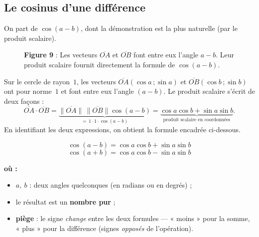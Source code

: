 \documentclass[11pt,a4paper]{article}
\newenvironment{ou}{%
  \par\smallskip\noindent\textbf{où :}\nopagebreak
  \begin{itemize}[leftmargin=1.8em,topsep=2pt,itemsep=1.5pt,parsep=0pt]}%
  {\end{itemize}}
\begin{document}
\subsection{Le cosinus d'une différence}
On part de $\cos(a-b)$, dont la démonstration est la plus naturelle (par le produit scalaire).

\begin{figure}[h]
\centering
{}
\caption*{\small\textbf{\textcolor{primary}{Figure 9}} : Les vecteurs $\overline{OA}$ et $\overline{OB}$
font entre eux l'angle $a-b$. Leur produit scalaire fournit directement la formule de $\cos(a-b)$.}
\end{figure}

\begin{theoreme}
Sur le cercle de rayon~$1$, les vecteurs $\overline{OA}(\cos a\,;\sin a)$ et
$\overline{OB}(\cos b\,;\sin b)$ ont pour norme~$1$ et font entre eux l'angle $(a-b)$. Le produit
scalaire s'écrit de deux façons :
\[
\overline{OA}\cdot\overline{OB}
=\underbrace{\lVert\overline{OA}\rVert\,\lVert\overline{OB}\rVert\cos(a-b)}_{=\,1\cdot1\cdot\cos(a-b)}
=\underbrace{\cos a\cos b+\sin a\sin b}_{\text{produit scalaire en coordonnées}}.
\]
En identifiant les deux expressions, on obtient la formule encadrée ci-dessous.
\end{theoreme}

\begin{formule}
\[
\boxed{\;\cos(a-b)=\cos a\cos b+\sin a\sin b\;}
\]
\[
\boxed{\;\cos(a+b)=\cos a\cos b-\sin a\sin b\;}
\]
\begin{ou}
  \item $a,\ b$ : deux angles quelconques (en radians ou en degrés) ;
  \item le résultat est un \textbf{nombre pur} ;
  \item \textbf{piège} : le signe \emph{change} entre les deux formules --- « moins » pour la somme,
        « plus » pour la différence (signes \emph{opposés} de l'opération).
\end{ou}
\end{formule}
\end{document}
